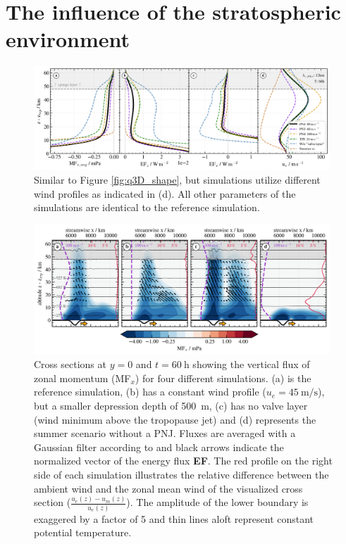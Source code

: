 \section{The influence of the stratospheric environment}
\label{sec:q3D-wind}
\begin{figure}[t]
    \centering
    \includegraphics[width=0.99\textwidth]{figures_q3D/TD-zprofiles-translbq3D_wind-T60h-avg.png}
    \caption{Similar to Figure \ref{fig:q3D_shape}, but simulations utilize different wind profiles as indicated in (d). All other parameters of the simulations are identical to the reference simulation.}
    \label{fig:q3D_wind}
\end{figure}
%
\begin{figure}[t]
    \centering
    \includegraphics[width=0.99\textwidth]{figures_q3D/Q3D-MFx-towers.png}
    \caption{Cross sections at $y=0$ and $t=\SI{60}{\hour}$ showing the vertical flux of zonal momentum (MF$_x$) for four different simulations. (a) is the reference simulation, (b) has a constant wind profile ($u_e=\SI{45}{\meter\per\second}$), but a smaller depression depth of \SI{500}{\meter}, (c) has no valve layer (wind minimum above the tropopause jet) and (d) represents the summer scenario without a PNJ. Fluxes are averaged with a Gaussian filter according to \textcite[]{kruse_gravity_2015} and black arrows indicate the normalized vector of the energy flux \textbf{EF}. The red profile on the right side of each simulation illustrates the relative difference between the ambient wind and the zonal mean wind of the visualized cross section ($\frac{u_e(z)-u_m(z)}{u_e(z)}$). The amplitude of the lower boundary is exaggered by a factor of 5 and thin lines aloft represent constant potential temperature.}
    \label{fig:q3D-mfx-towers}
\end{figure}
